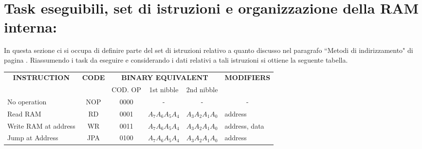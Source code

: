 \section {Task eseguibili, set di istruzioni e organizzazione della RAM interna:}
In questa sezione ci si occupa di definire parte del set di istruzioni relativo a quanto discusso nel paragrafo \textquotedblleft Metodi di indirizzamento" di pagina \pageref{metodi_di_indirizzamento}. Riassumendo i task da eseguire e considerando i dati relativi a tali istruzioni si ottiene la seguente tabella.
\begin{table}[H]
	\centering
	\footnotesize
	\fontsize{10}{18}\selectfont
	\begin{tabular}{|p{0.5cm}|p{0.5cm}|p{0.5cm}|p{0.5cm}|p{0.5cm}|p{0.5cm}|}
		\hline
		\multicolumn{1}{|c|}{\textbf{INSTRUCTION}} & \multicolumn{1}{c|}{\textbf{CODE}} & 
		\multicolumn{3}{c|}{\textbf{BINARY EQUIVALENT}} & \multicolumn{1}{l|}{\textbf{MODIFIERS}} \\
		
		& & \multicolumn{1}{|c|}{COD. OP}  & \multicolumn{1}{|c|}{1st nibble} & \multicolumn{1}{|c|}{2nd nibble} & 	 \\ \hline
		
		\multicolumn{1}{|l|}{No operation}	&
		\multicolumn{1}{|c|}{NOP}  &
		\multicolumn{1}{|c|}{0000}	&
		\multicolumn{1}{|c|}{-} &
		\multicolumn{1}{|c|}{-} &
		\multicolumn{1}{|c|}{-}	\\ \hline
		
		
		\multicolumn{1}{|l|}{Read RAM}	&
		\multicolumn{1}{|c|}{RD}  &
		\multicolumn{1}{|c|}{0001}	&
		\multicolumn{1}{|c|}{$A_7A_6A_5A_4$} &
		\multicolumn{1}{|c|}{$A_3A_2A_1A_0$} &
		\multicolumn{1}{|l|}{address}	\\ \hline
		
		\multicolumn{1}{|l|}{Write RAM at address}	&
		\multicolumn{1}{|c|}{WR}  &
		\multicolumn{1}{|c|}{0011}	&
		\multicolumn{1}{|c|}{$A_7A_6A_5A_4$} &
		\multicolumn{1}{|c|}{$A_3A_2A_1A_0$} &
		\multicolumn{1}{|l|}{address, data}	\\ \hline
		
		\multicolumn{1}{|l|}{Jump at Address}	&
		\multicolumn{1}{|c|}{JPA}  &
		\multicolumn{1}{|c|}{0100}	&
		\multicolumn{1}{|c|}{$A_7A_6A_5A_4$} &
		\multicolumn{1}{|c|}{$A_3A_2A_1A_0$} &
		\multicolumn{1}{|l|}{address}	\\ \hline
		

\end{tabular}
\end{table}
